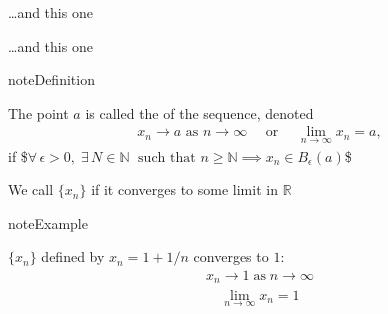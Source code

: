 \documentclass[letterpaper,10pt,english]{jupyterBook}
\begin{document}
\sphinxAtStartPar
…and this one

\begin{figure}[htbp]
\centering

\noindent{}
\end{figure}

\sphinxAtStartPar
…and this one

\begin{figure}[htbp]
\centering

\noindent{}
\end{figure}

\begin{sphinxadmonition}{note}{Definition}

\sphinxAtStartPar
The point \(a\) is called the  of the sequence, denoted
\begin{equation*}
\begin{split} 
x_n \to a \text{ as } n \to \infty 
\quad \text{ or } \quad
\lim_{n \to \infty} x_n = a,
\end{split}
\end{equation*}
\sphinxAtStartPar
if
\$\(
\forall \, \epsilon > 0, \;
\exists \, N \in \mathbb{N} \; 
\text{ such that } n \geq \mathbb{N} \implies x_n \in B_{\epsilon}(a)
\)\$
\end{sphinxadmonition}

\sphinxAtStartPar
We call \(\{ x_n \}\)  if it converges to some limit in
\(\mathbb{R}\)

\begin{sphinxadmonition}{note}{Example}

\sphinxAtStartPar
\(\{x_n\}\) defined by \(x_n = 1 + 1/n\) converges to \(1\):
\begin{equation*}
\begin{split}
x_n \to 1 \; \mathrm{as} \; n \to \infty
\end{split}
\end{equation*}\begin{equation*}
\begin{split}
\lim_{n \to \infty} x_n = 1
\end{split}
\end{equation*}\end{sphinxadmonition}
\end{document}
